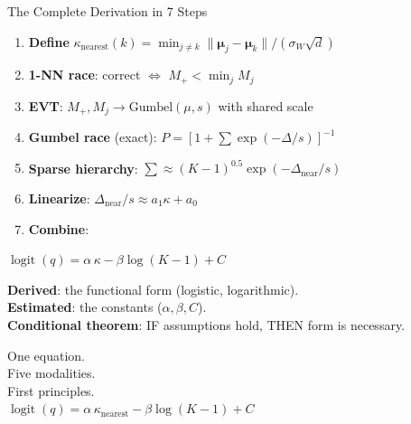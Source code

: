 \documentclass[aspectratio=169,14pt]{beamer}
\DeclareMathOperator{\logit}{logit}
\begin{document}
\begin{frame}{The Complete Derivation in 7 Steps}
\small
\begin{enumerate}
\item \textbf{Define} $\kappa_\mathrm{nearest}(k) = \min_{j\neq k} \|\boldsymbol{\mu}_j - \boldsymbol{\mu}_k\| / (\sigma_W\sqrt{d})$
\item \textbf{1-NN race}: correct $\iff$ $M_+ < \min_j M_j$
\item \textbf{EVT}: $M_+, M_j \to \mathrm{Gumbel}(\mu, s)$ with shared scale
\item \textbf{Gumbel race} (exact): $P = [1 + \sum \exp(-\Delta/s)]^{-1}$
\item \textbf{Sparse hierarchy}: $\sum \approx (K{-}1)^{0.5} \exp(-\Delta_\mathrm{near}/s)$
\item \textbf{Linearize}: $\Delta_\mathrm{near}/s \approx a_1\kappa + a_0$
\item \textbf{Combine}:
\end{enumerate}

\begin{center}
\LARGE\color{ctiblue}
$\logit(q) = \alpha\,\kappa - \beta\log(K{-}1) + C$
\end{center}

\normalsize
\textbf{Derived}: the functional form (logistic, logarithmic).\\
\textbf{Estimated}: the constants ($\alpha, \beta, C$).\\
\textbf{Conditional theorem}: IF assumptions hold, THEN form is necessary.
\end{frame}

\begin{frame}{}
\begin{center}
\Huge\color{ctiblue}
One equation.\\[0.3cm]
Five modalities.\\[0.3cm]
First principles.\\[1cm]

\Large\color{black}
$\logit(q) = \alpha\,\kappa_\mathrm{nearest} - \beta\log(K{-}1) + C$
\end{center}
\end{frame}
\end{document}
